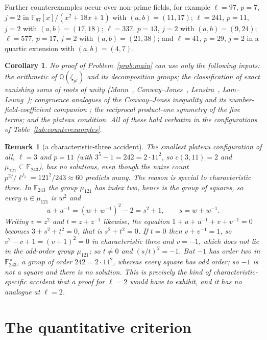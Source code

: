 \documentclass[a4paper]{article}
\newtheorem{corollary}[theorem]{Corollary}
\newtheorem{remark}[theorem]{Remark}
\newcommand{\F}{\mathbb{F}}
\newcommand{\Q}{\mathbb{Q}}
\begin{document}
Further counterexamples occur over non-prime fields, for example
$\ell=97$, $p=7$, $j=2$ in
$\F_{97}[x]/(x^2+18x+1)$ with $(a,b)=(11,17)$;
$\ell=241$, $p=11$, $j=2$ with $(a,b)=(17,18)$;
$\ell=337$, $p=13$, $j=2$ with $(a,b)=(9,24)$;
$\ell=577$, $p=17$, $j=2$ with $(a,b)=(21,38)$;
and $\ell=41$, $p=29$, $j=2$ in a quartic extension with $(a,b)=(4,7)$.

\begin{corollary}\label{cor:no-structural-proof}
	No proof of Problem~\ref{prob:main} can use only the following inputs:
	the arithmetic of $\Q(\zeta_{p^j})$ and its decomposition groups; the
	classification of exact vanishing sums of roots of unity
	(Mann~\cite{Mann1965}, Conway--Jones~\cite{ConwayJones1976},
	Lenstra~\cite{Lenstra1979}, Lam--Leung~\cite{LamLeung2000});
	congruence analogues of the Conway--Jones inequality
	\cite{DvornicichZannier2002} and its number-field-coefficient companion
	\cite{DvornicichZannier2000}; the
	reciprocal product-one symmetry of the five terms; and the plateau
	condition.
	All of these hold verbatim in the configurations of
	Table~\ref{tab:counterexamples}.
\end{corollary}

\begin{remark}[a characteristic-three accident]
	The smallest plateau configuration of all, $\ell=3$ and $p=11$ (with
	$3^{5}-1=242=2\cdot11^{2}$, so $c(3,11)=2$ and
	$\mu_{121}\subseteq\F_{243}$), has \emph{no} solutions, even though the
	naive count $p^{2j}/\ell^{f_1}=121^2/243\approx60$ predicts many.
	The reason is special to characteristic three.
	In $\F_{243}$ the group $\mu_{121}$ has index two, hence is the group of
	squares, so every $u\in\mu_{121}$ is $w^{2}$ and
	\[
		u+u^{-1}=\left(w+w^{-1}\right)^{2}-2=s^{2}+1,
		\qquad s=w+w^{-1}.
	\]
	Writing $v=z^{2}$ and $t=z+z^{-1}$ likewise, the equation
	$1+u+u^{-1}+v+v^{-1}=0$ becomes $3+s^{2}+t^{2}=0$, that is
	$s^{2}+t^{2}=0$.
	If $t=0$ then $v+v^{-1}=1$, so $v^{2}-v+1=(v+1)^{2}=0$ in
	characteristic three and $v=-1$, which does not lie in the odd-order
	group $\mu_{121}$; so $t\ne0$ and $(s/t)^{2}=-1$.
	But $-1$ has order two in $\F_{243}^{\times}$, a group of order
	$242=2\cdot11^{2}$, whereas every square has odd order; so $-1$ is not a
	square and there is no solution.
	This is precisely the kind of characteristic-specific accident that a
	proof for $\ell=2$ would have to exhibit, and it has no analogue at
	$\ell=2$.
\end{remark}

\section{The quantitative criterion}\label{sec:quantitative}
\end{document}
